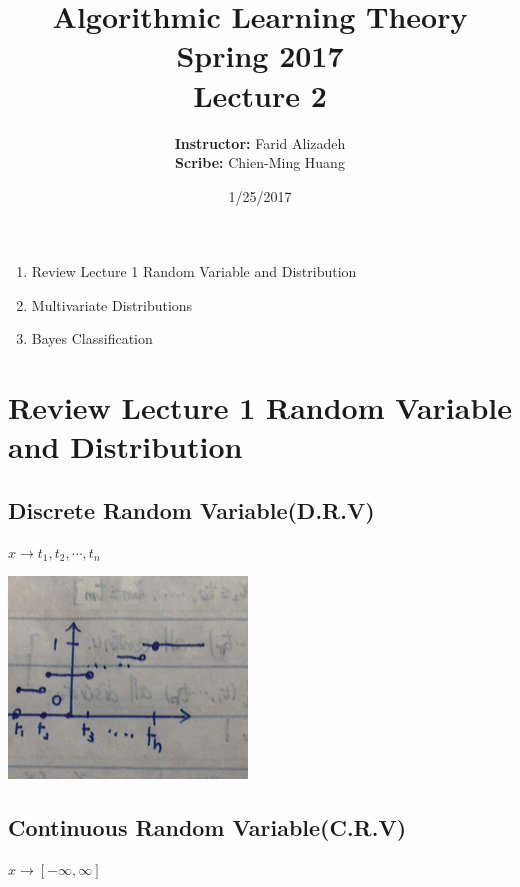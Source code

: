 \documentclass{article}
\title{ 
Algorithmic Learning Theory\\
Spring 2017\\
Lecture 2 %
}
\author{
{\bf Instructor:} Farid Alizadeh\\
{\bf Scribe:} Chien-Ming Huang\\
}
\date{1/25/2017} %
\begin{document}
\pagestyle{fancy}

\maketitle
%


\medskip
\begin{enumerate}
\item Review Lecture 1 Random Variable and Distribution
\item  Multivariate Distributions
\item Bayes Classification
\end{enumerate}

\section{Review Lecture 1 Random Variable and Distribution} 
\subsection{Discrete Random Variable(D.R.V)}
	$ x\rightarrow t_1, t_2, \cdots, t_n$
	
\begin{center}{
\includegraphics{discreterv.png}
}
\end{center}    
        
\subsection{Continuous Random Variable(C.R.V)}        
	$ x\rightarrow [ -\infty, \infty] $
\end{document}

